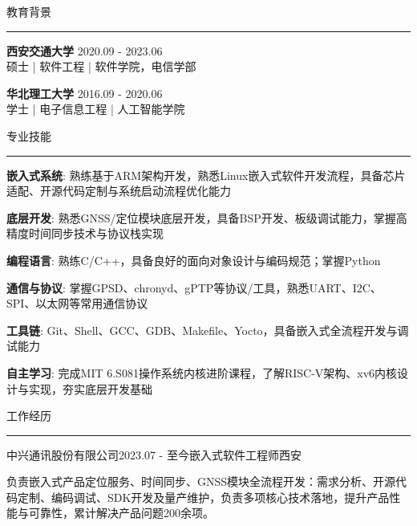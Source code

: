 \documentclass{cv}
\renewenvironment{rSection}[1]{
\sectionskip
\textcolor{RoyalPurple}{\MakeUppercase{#1}}
\sectionlineskip
\hrule
\begin{list}{}{
\setlength{\leftmargin}{1.5em}
}
\item[]
}{
\end{list}
}
\begin{document}
\begin{rSection}{教育背景}
	{\bf 西安交通大学} \hfill {2020.09 - 2023.06} \\
	硕士 | 软件工程 | 软件学院，电信学部

	{\bf 华北理工大学} \hfill {2016.09 - 2020.06} \\
	学士 | 电子信息工程 | 人工智能学院
\end{rSection}

\begin{rSection}{专业技能}
	\begin{rSubsection}{}{}{}{}
		\item \textbf{嵌入式系统}: 熟练基于ARM架构开发，熟悉Linux嵌入式软件开发流程，具备芯片适配、开源代码定制与系统启动流程优化能力
		\item \textbf{底层开发}: 熟悉GNSS/定位模块底层开发，具备BSP开发、板级调试能力，掌握高精度时间同步技术与协议栈实现
		\item \textbf{编程语言}: 熟练C/C++，具备良好的面向对象设计与编码规范；掌握Python
		\item \textbf{通信与协议}: 掌握GPSD、chronyd、gPTP等协议/工具，熟悉UART、I2C、SPI、以太网等常用通信协议
		\item \textbf{工具链}: Git、Shell、GCC、GDB、Makefile、Yocto，具备嵌入式全流程开发与调试能力
		\item \textbf{自主学习}: 完成MIT 6.S081操作系统内核进阶课程，了解RISC-V架构、xv6内核设计与实现，夯实底层开发基础
	\end{rSubsection}
\end{rSection}

\begin{rSection}{工作经历}
	\begin{rSubsection}{中兴通讯股份有限公司}{2023.07 - 至今}{嵌入式软件工程师}{西安}
		\item 负责嵌入式产品定位服务、时间同步、GNSS模块全流程开发：需求分析、开源代码定制、编码调试、SDK开发及量产维护，负责多项核心技术落地，提升产品性能与可靠性，累计解决产品问题200余项。
	\end{rSubsection}
\end{rSection}
\end{document}
